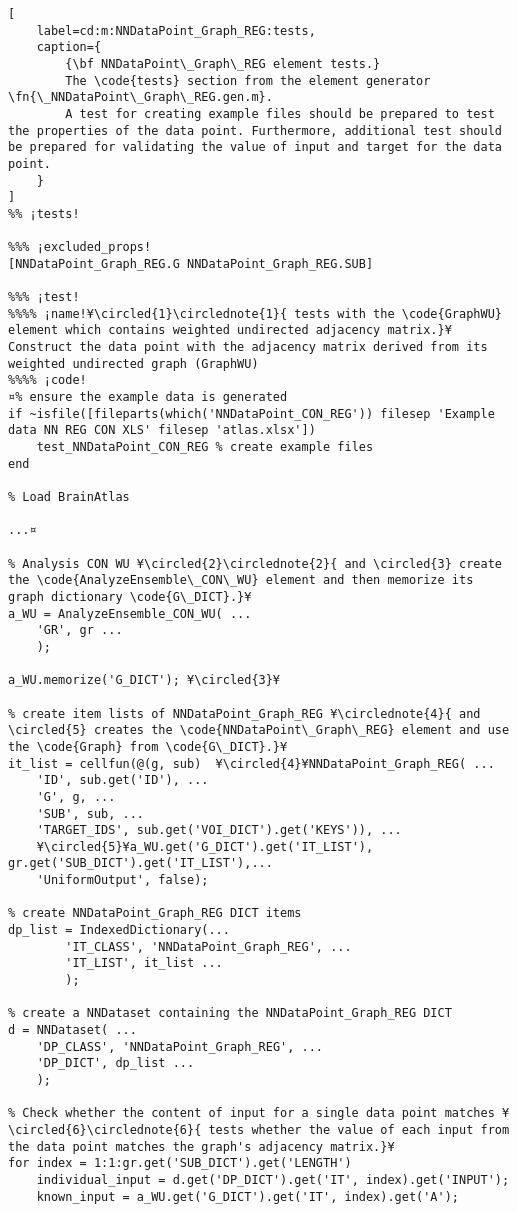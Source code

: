 \documentclass{tufte-handout}
\begin{document}
\begin{lstlisting}[
	label=cd:m:NNDataPoint_Graph_REG:tests,
	caption={
		{\bf NNDataPoint\_Graph\_REG element tests.}
		The \code{tests} section from the element generator \fn{\_NNDataPoint\_Graph\_REG.gen.m}.
		A test for creating example files should be prepared to test the properties of the data point. Furthermore, additional test should be prepared for validating the value of input and target for the data point.
	}
]		
%% ¡tests!

%%% ¡excluded_props!
[NNDataPoint_Graph_REG.G NNDataPoint_Graph_REG.SUB]

%%% ¡test!
%%%% ¡name!¥\circled{1}\circlednote{1}{ tests with the \code{GraphWU} element which contains weighted undirected adjacency matrix.}¥
Construct the data point with the adjacency matrix derived from its weighted undirected graph (GraphWU) 
%%%% ¡code!
¤% ensure the example data is generated
if ~isfile([fileparts(which('NNDataPoint_CON_REG')) filesep 'Example data NN REG CON XLS' filesep 'atlas.xlsx'])
    test_NNDataPoint_CON_REG % create example files
end

% Load BrainAtlas

...¤

% Analysis CON WU ¥\circled{2}\circlednote{2}{ and \circled{3} create the \code{AnalyzeEnsemble\_CON\_WU} element and then memorize its graph dictionary \code{G\_DICT}.}¥
a_WU = AnalyzeEnsemble_CON_WU( ...
    'GR', gr ...
    );

a_WU.memorize('G_DICT'); ¥\circled{3}¥

% create item lists of NNDataPoint_Graph_REG ¥\circlednote{4}{ and \circled{5} creates the \code{NNDataPoint\_Graph\_REG} element and use the \code{Graph} from \code{G\_DICT}.}¥
it_list = cellfun(@(g, sub)  ¥\circled{4}¥NNDataPoint_Graph_REG( ...
    'ID', sub.get('ID'), ...
    'G', g, ...
    'SUB', sub, ...
    'TARGET_IDS', sub.get('VOI_DICT').get('KEYS')), ...
    ¥\circled{5}¥a_WU.get('G_DICT').get('IT_LIST'), gr.get('SUB_DICT').get('IT_LIST'),...
    'UniformOutput', false);

% create NNDataPoint_Graph_REG DICT items
dp_list = IndexedDictionary(...
        'IT_CLASS', 'NNDataPoint_Graph_REG', ...
        'IT_LIST', it_list ...
        );

% create a NNDataset containing the NNDataPoint_Graph_REG DICT
d = NNDataset( ...
    'DP_CLASS', 'NNDataPoint_Graph_REG', ...
    'DP_DICT', dp_list ...
    );

% Check whether the content of input for a single data point matches ¥\circled{6}\circlednote{6}{ tests whether the value of each input from the data point matches the graph's adjacency matrix.}¥
for index = 1:1:gr.get('SUB_DICT').get('LENGTH')
    individual_input = d.get('DP_DICT').get('IT', index).get('INPUT');
    known_input = a_WU.get('G_DICT').get('IT', index).get('A');


\end{lstlisting}
\end{document}
